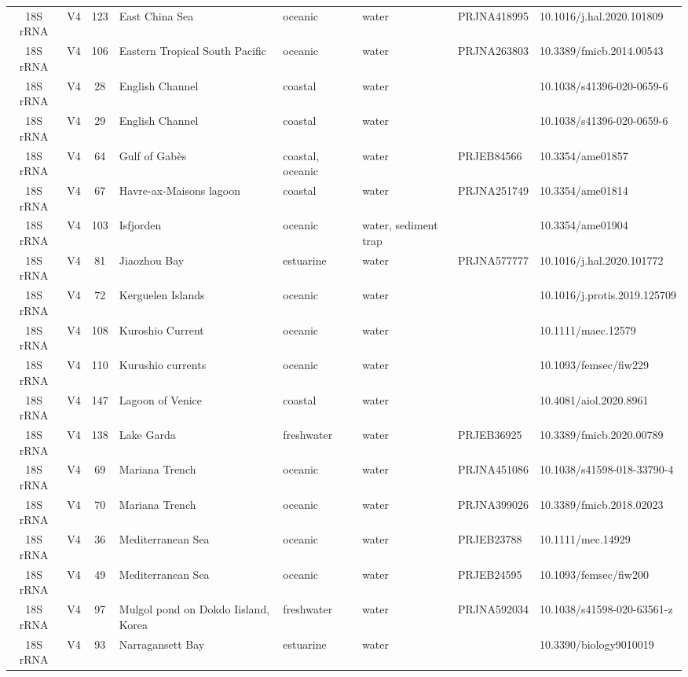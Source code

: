 \begin{longtable}{ccclllll}
  18S rRNA & V4 & 123 & East China Sea & oceanic & water & PRJNA418995 & 10.1016/j.hal.2020.101809 \\ 
  18S rRNA & V4 & 106 & Eastern Tropical South Pacific & oceanic & water & PRJNA263803 & 10.3389/fmicb.2014.00543 \\ 
  18S rRNA & V4 & 28 & English Channel & coastal & water &  & 10.1038/s41396-020-0659-6 \\ 
  18S rRNA & V4 & 29 & English Channel & coastal & water &  & 10.1038/s41396-020-0659-6 \\ 
  18S rRNA & V4 & 64 & Gulf of Gabès & coastal, oceanic & water & PRJEB84566 & 10.3354/ame01857 \\ 
  18S rRNA & V4 & 67 & Havre-ax-Maisons lagoon & coastal & water & PRJNA251749 & 10.3354/ame01814 \\ 
  18S rRNA & V4 & 103 & Isfjorden & oceanic & water, sediment trap &  & 10.3354/ame01904 \\ 
  18S rRNA & V4 & 81 & Jiaozhou Bay & estuarine & water & PRJNA577777 & 10.1016/j.hal.2020.101772 \\ 
  18S rRNA & V4 & 72 & Kerguelen Islands & oceanic & water &  & 10.1016/j.protis.2019.125709 \\ 
  18S rRNA & V4 & 108 & Kuroshio Current & oceanic & water &  & 10.1111/maec.12579 \\ 
  18S rRNA & V4 & 110 & Kurushio currents & oceanic & water &  & 10.1093/femsec/fiw229 \\ 
  18S rRNA & V4 & 147 & Lagoon of Venice & coastal & water &  & 10.4081/aiol.2020.8961 \\ 
  18S rRNA & V4 & 138 & Lake Garda & freshwater & water & PRJEB36925 & 10.3389/fmicb.2020.00789 \\ 
  18S rRNA & V4 & 69 & Mariana Trench & oceanic & water & PRJNA451086 & 10.1038/s41598-018-33790-4 \\ 
  18S rRNA & V4 & 70 & Mariana Trench & oceanic & water & PRJNA399026 & 10.3389/fmicb.2018.02023 \\ 
  18S rRNA & V4 & 36 & Mediterranean Sea & oceanic & water & PRJEB23788 & 10.1111/mec.14929 \\ 
  18S rRNA & V4 & 49 & Mediterranean Sea & oceanic & water & PRJEB24595 & 10.1093/femsec/fiw200 \\ 
  18S rRNA & V4 & 97 & Mulgol pond on Dokdo Iisland, Korea & freshwater & water & PRJNA592034 & 10.1038/s41598-020-63561-z \\ 
  18S rRNA & V4 & 93 & Narragansett Bay & estuarine & water &  & 10.3390/biology9010019 \\ 

\end{longtable}
